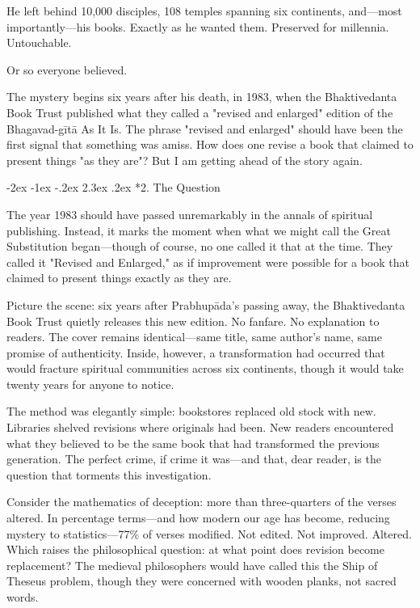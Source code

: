 \documentclass[12pt,twoside]{book}
\makeatletter
\def\cleardoublepage{\clearpage\if@twoside \ifodd\c@page\else\hbox{}\thispagestyle{empty}\newpage\if@twocolumn\hbox{}\newpage\fi\fi\fi}
\renewcommand\section{\@startsection{section}{1}{\z@}%
{-2ex \@plus -1ex \@minus -.2ex}%
{2.3ex \@plus.2ex}%
{\normalfont\Large\bfseries}}
\makeatother
\begin{document}
He left behind 10,000 disciples, 108 temples spanning six continents, and—most importantly—his books. Exactly as he wanted them. Preserved for millennia. Untouchable.

Or so everyone believed.

The mystery begins six years after his death, in 1983, when the Bhaktivedanta Book Trust published what they called a "revised and enlarged" edition of the Bhagavad-gītā As It Is. The phrase "revised and enlarged" should have been the first signal that something was amiss. How does one revise a book that claimed to present things "as they are"? But I am getting ahead of the story again.

\cleardoublepage
\vspace*{0.20\textheight}
\section*{2. The Question}
\thispagestyle{chapterpage}

\normalfont\justifying
The year 1983 should have passed unremarkably in the annals of spiritual publishing. Instead, it marks the moment when what we might call the Great Substitution began—though of course, no one called it that at the time. They called it "Revised and Enlarged," as if improvement were possible for a book that claimed to present things exactly as they are.

Picture the scene: six years after Prabhupāda's passing away, the Bhaktivedanta Book Trust quietly releases this new edition. No fanfare. No explanation to readers. The cover remains identical—same title, same author's name, same promise of authenticity. Inside, however, a transformation had occurred that would fracture spiritual communities across six continents, though it would take twenty years for anyone to notice.

The method was elegantly simple: bookstores replaced old stock with new. Libraries shelved revisions where originals had been. New readers encountered what they believed to be the same book that had transformed the previous generation. The perfect crime, if crime it was—and that, dear reader, is the question that torments this investigation.

Consider the mathematics of deception: more than three-quarters of the verses altered. In percentage terms—and how modern our age has become, reducing mystery to statistics—77\% of verses modified. Not edited. Not improved. Altered. Which raises the philosophical question: at what point does revision become replacement? The medieval philosophers would have called this the Ship of Theseus problem, though they were concerned with wooden planks, not sacred words.
\end{document}

